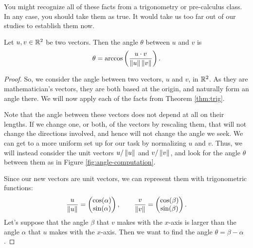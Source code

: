 \documentclass[elementsmain.tex]{subfiles}
\begin{document}
You might recognize all of these facts from a trigonometry or pre-calculus class. In any case, you should take them as true. It would take us too far out of our studies to establish them now.


\begin{theorem}[Angles in $\R^2$]
Let $u, v \in \mathbb{R}^2$ be two vectors. Then the angle $\theta$ between $u$ and $v$ is 
\[
\theta = \arccos\left(\dfrac{u\cdot v}{\left\|u\right\|\left\|v\right\|}\right).
\]
\end{theorem}

\begin{proof}
So, we consider the angle between two vectors, $u$ and $v$, in $\R^2$. As they are mathematician's vectors, they are both based at the origin, and naturally form an angle there. We will now apply each of the facts from Theorem \ref{thm:trig}.

Note that the angle between these vectors does not depend at all on their lengths. 
If we change one, or both, of the vectors by rescaling them, that will not change the directions involved, and hence will not change the angle we seek. 
We can get to a more uniform set up for our task by normalizing $u$ and $v$. 
Thus, we will instead consider the unit vectors $u/\left\|u\right\|$ and $v/\left\|v\right\|$, and look for the angle $\theta$ between them as in Figure \ref{fig:angle-computation}.

Since our new vectors are unit vectors, we can represent them with trigonometric functions:
\[
\frac{u}{\left\|u\right\|} = \begin{pmatrix} \cos(\alpha)\\ \sin(\alpha) \end{pmatrix}, \qquad
\frac{v}{\left\|v\right\|} = \begin{pmatrix} \cos(\beta)\\ \sin(\beta) \end{pmatrix}.
\]
Let's suppose that the angle $\beta$ that $v$ makes with the $x$-axis is larger than the angle $\alpha$ that $u$ makes with the $x$-axis. Then we want to find the angle $\theta = \beta-\alpha$. 


\end{proof}
\end{document}
